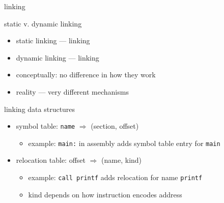 \usetikzlibrary{positioning}
\begin{frame}{linking}
\end{frame}

\begin{frame}{static v. dynamic linking}
    \begin{itemize}
    \item static linking --- linking 
    \item dynamic linking --- linking 
    \vspace{.5cm}
    \item<2> conceptually: no difference in how they work
    \item<2> reality --- very different mechanisms
    \end{itemize}
\end{frame}

\begin{frame}{linking data structures}
    \begin{itemize}
    \item symbol table: {\tt name} $\Rightarrow$ (section, offset)
        \begin{itemize}
        \item example: {\tt main:} in assembly adds symbol table entry for {\tt main}
        \end{itemize}
    \item relocation table: offset $\Rightarrow$ (name, kind)
        \begin{itemize}
        \item example: {\tt call printf} adds relocation for name {\tt printf}
        \item kind depends on how instruction encodes address
        \end{itemize}
    \end{itemize}
\end{frame}


